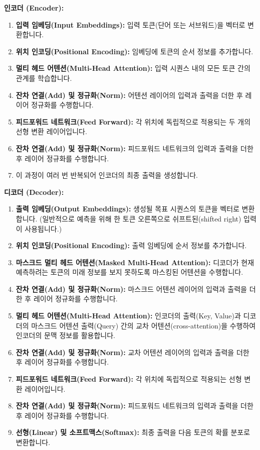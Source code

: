 \documentclass[11pt,a4paper]{article}
\begin{document}
\begin{tcolorbox}[title={트랜스포머 아키텍처의 주요 흐름 (개념도 설명)}, colback=white, colframe=black]
\textbf{인코더 (Encoder):}
\begin{enumerate}
    \item \textbf{입력 임베딩(Input Embeddings):} 입력 토큰(단어 또는 서브워드)을 벡터로 변환합니다.
    \item \textbf{위치 인코딩(Positional Encoding):} 임베딩에 토큰의 순서 정보를 추가합니다.
    \item \textbf{멀티 헤드 어텐션(Multi-Head Attention):} 입력 시퀀스 내의 모든 토큰 간의 관계를 학습합니다.
    \item \textbf{잔차 연결(Add) 및 정규화(Norm):} 어텐션 레이어의 입력과 출력을 더한 후 레이어 정규화를 수행합니다.
    \item \textbf{피드포워드 네트워크(Feed Forward):} 각 위치에 독립적으로 적용되는 두 개의 선형 변환 레이어입니다.
    \item \textbf{잔차 연결(Add) 및 정규화(Norm):} 피드포워드 네트워크의 입력과 출력을 더한 후 레이어 정규화를 수행합니다.
    \item 이 과정이 여러 번 반복되어 인코더의 최종 출력을 생성합니다.
\end{enumerate}

\textbf{디코더 (Decoder):}
\begin{enumerate}
    \item \textbf{출력 임베딩(Output Embeddings):} 생성될 목표 시퀀스의 토큰을 벡터로 변환합니다. (일반적으로 예측을 위해 한 토큰 오른쪽으로 쉬프트된(shifted right) 입력이 사용됩니다.)
    \item \textbf{위치 인코딩(Positional Encoding):} 출력 임베딩에 순서 정보를 추가합니다.
    \item \textbf{마스크드 멀티 헤드 어텐션(Masked Multi-Head Attention):} 디코더가 현재 예측하려는 토큰의 미래 정보를 보지 못하도록 마스킹된 어텐션을 수행합니다.
    \item \textbf{잔차 연결(Add) 및 정규화(Norm):} 마스크드 어텐션 레이어의 입력과 출력을 더한 후 레이어 정규화를 수행합니다.
    \item \textbf{멀티 헤드 어텐션(Multi-Head Attention):} 인코더의 출력(Key, Value)과 디코더의 마스크드 어텐션 출력(Query) 간의 교차 어텐션(cross-attention)을 수행하여 인코더의 문맥 정보를 활용합니다.
    \item \textbf{잔차 연결(Add) 및 정규화(Norm):} 교차 어텐션 레이어의 입력과 출력을 더한 후 레이어 정규화를 수행합니다.
    \item \textbf{피드포워드 네트워크(Feed Forward):} 각 위치에 독립적으로 적용되는 선형 변환 레이어입니다.
    \item \textbf{잔차 연결(Add) 및 정규화(Norm):} 피드포워드 네트워크의 입력과 출력을 더한 후 레이어 정규화를 수행합니다.
    \item \textbf{선형(Linear) 및 소프트맥스(Softmax):} 최종 출력을 다음 토큰의 확률 분포로 변환합니다.
\end{enumerate}
\end{tcolorbox}
\end{document}
